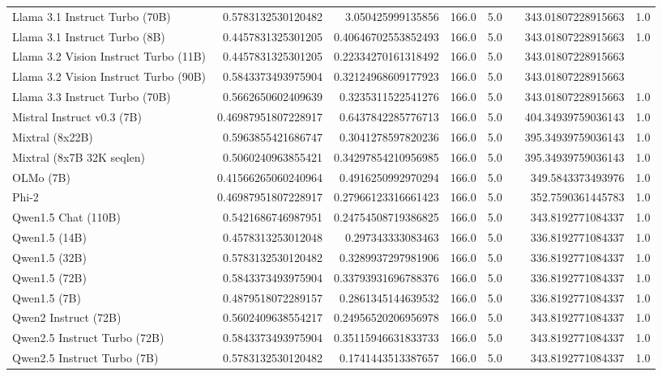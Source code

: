 \begin{table}[htp]
{\begin{tabular}{lrrrrrrr}
Llama 3.1 Instruct Turbo (70B) & 0.5783132530120482 & 3.050425999135856 & 166.0 & 5.0 &  & 343.01807228915663 & 1.0 \\
Llama 3.1 Instruct Turbo (8B) & 0.4457831325301205 & 0.40646702553852493 & 166.0 & 5.0 &  & 343.01807228915663 & 1.0 \\
Llama 3.2 Vision Instruct Turbo (11B) & 0.4457831325301205 & 0.22334270161318492 & 166.0 & 5.0 &  & 343.01807228915663 &  \\
Llama 3.2 Vision Instruct Turbo (90B) & 0.5843373493975904 & 0.32124968609177923 & 166.0 & 5.0 &  & 343.01807228915663 &  \\
Llama 3.3 Instruct Turbo (70B) & 0.5662650602409639 & 0.3235311522541276 & 166.0 & 5.0 &  & 343.01807228915663 & 1.0 \\
Mistral Instruct v0.3 (7B) & 0.46987951807228917 & 0.6437842285776713 & 166.0 & 5.0 &  & 404.34939759036143 & 1.0 \\
Mixtral (8x22B) & 0.5963855421686747 & 0.3041278597820236 & 166.0 & 5.0 &  & 395.34939759036143 & 1.0 \\
Mixtral (8x7B 32K seqlen) & 0.5060240963855421 & 0.34297854210956985 & 166.0 & 5.0 &  & 395.34939759036143 & 1.0 \\
OLMo (7B) & 0.41566265060240964 & 0.4916250992970294 & 166.0 & 5.0 &  & 349.5843373493976 & 1.0 \\
Phi-2 & 0.46987951807228917 & 0.27966123316661423 & 166.0 & 5.0 &  & 352.7590361445783 & 1.0 \\
Qwen1.5 Chat (110B) & 0.5421686746987951 & 0.24754508719386825 & 166.0 & 5.0 &  & 343.8192771084337 & 1.0 \\
Qwen1.5 (14B) & 0.4578313253012048 & 0.297343333083463 & 166.0 & 5.0 &  & 336.8192771084337 & 1.0 \\
Qwen1.5 (32B) & 0.5783132530120482 & 0.3289937297981906 & 166.0 & 5.0 &  & 336.8192771084337 & 1.0 \\
Qwen1.5 (72B) & 0.5843373493975904 & 0.33793931696788376 & 166.0 & 5.0 &  & 336.8192771084337 & 1.0 \\
Qwen1.5 (7B) & 0.4879518072289157 & 0.2861345144639532 & 166.0 & 5.0 &  & 336.8192771084337 & 1.0 \\
Qwen2 Instruct (72B) & 0.5602409638554217 & 0.24956520206956978 & 166.0 & 5.0 &  & 343.8192771084337 & 1.0 \\
Qwen2.5 Instruct Turbo (72B) & 0.5843373493975904 & 0.35115946631833733 & 166.0 & 5.0 &  & 343.8192771084337 & 1.0 \\
Qwen2.5 Instruct Turbo (7B) & 0.5783132530120482 & 0.1741443513387657 & 166.0 & 5.0 &  & 343.8192771084337 & 1.0 \\

\end{tabular}}
\end{table}

